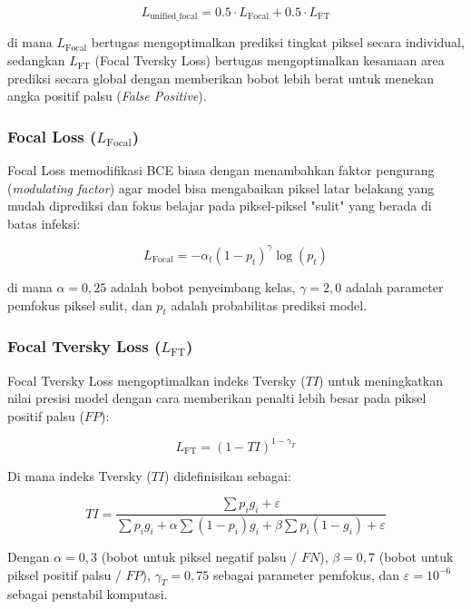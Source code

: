 \documentclass[12pt,a4paper,oneside]{book}
\begin{document}
\begin{equation}
  L_{\text{unified\_focal}} = 0.5 \cdot L_{\text{Focal}} + 0.5 \cdot L_{\text{FT}}
\end{equation}

di mana $L_{\text{Focal}}$ bertugas mengoptimalkan prediksi tingkat piksel secara individual, sedangkan $L_{\text{FT}}$ (Focal Tversky Loss) bertugas mengoptimalkan kesamaan area prediksi secara global dengan memberikan bobot lebih berat untuk menekan angka positif palsu (\textit{False Positive}).

\subsubsection{Focal Loss ($L_{\text{Focal}}$)}

Focal Loss memodifikasi BCE biasa dengan menambahkan faktor pengurang (\textit{modulating factor}) agar model bisa mengabaikan piksel latar belakang yang mudah diprediksi dan fokus belajar pada piksel-piksel "sulit" yang berada di batas infeksi:

\begin{equation}
  L_{\text{Focal}} = -\alpha_t (1 - p_t)^\gamma \log(p_t)
\end{equation}

di mana $\alpha = 0,25$ adalah bobot penyeimbang kelas, $\gamma = 2,0$ adalah parameter pemfokus piksel sulit, dan $p_t$ adalah probabilitas prediksi model.

\subsubsection{Focal Tversky Loss ($L_{\text{FT}}$)}

Focal Tversky Loss mengoptimalkan indeks Tversky ($TI$) untuk meningkatkan nilai presisi model dengan cara memberikan penalti lebih besar pada piksel positif palsu ($FP$):

\begin{equation}
  L_{\text{FT}} = (1 - TI)^{1 - \gamma_T}
\end{equation}

Di mana indeks Tversky ($TI$) didefinisikan sebagai:

\begin{equation}
  TI = \frac{\sum p_i g_i + \varepsilon}{\sum p_i g_i + \alpha \sum (1-p_i)g_i + \beta \sum p_i(1-g_i) + \varepsilon}
\end{equation}

Dengan $\alpha = 0,3$ (bobot untuk piksel negatif palsu / $FN$), $\beta = 0,7$ (bobot untuk piksel positif palsu / $FP$), $\gamma_T = 0,75$ sebagai parameter pemfokus, dan $\varepsilon = 10^{-6}$ sebagai penstabil komputasi.
\end{document}
